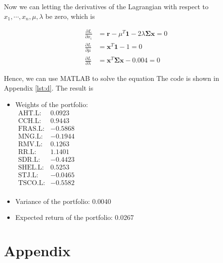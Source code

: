 \documentclass[12pt]{article}
\begin{document}
Now we can letting the derivatives of the Lagrangian with respect to \(x_1,
\cdots, x_n, \mu, \lambda\) be zero, which is

\[
    \begin{aligned}
        \frac{\partial L}{\partial x_i}     & =\mathbf{r} - \mu^T \mathbf{1} -
        2\lambda \mathbf{\Sigma} \mathbf{x} = 0                                \\
        \frac{\partial L}{\partial \mu}     & =\mathbf{x}^T \mathbf{1} - 1 = 0 \\
        \frac{\partial L}{\partial \lambda} & =\mathbf{x}^T \mathbf{\Sigma}
        \mathbf{x} - 0.004 = 0
    \end{aligned}
\]

Hence, we can use MATLAB to solve the equation
The code is shown in Appendix \ref{lst:d}. The result is

\begin{itemize}
    \item Weights of the portfolio: \\ \(
          \begin{array}{rr}
              \text{AHT.L:}  & 0.0923  \\
              \text{CCH.L:}  & 0.9443  \\
              \text{FRAS.L:} & -0.5868 \\
              \text{MNG.L:}  & -0.1944 \\
              \text{RMV.L:}  & 0.1263  \\
              \text{RR.L:}   & 1.1401  \\
              \text{SDR.L:}  & -0.4423 \\
              \text{SHEL.L:} & 0.5253  \\
              \text{STJ.L:}  & -0.0465 \\
              \text{TSCO.L:} & -0.5582 \\
          \end{array}
          \)
    \item Variance of the portfolio: 0.0040
    \item Expected return of the portfolio: 0.0267
\end{itemize}

\clearpage
\appendix
\section*{Appendix}
\renewcommand{\thesubsection}{\Alph{subsection}}
\end{document}
